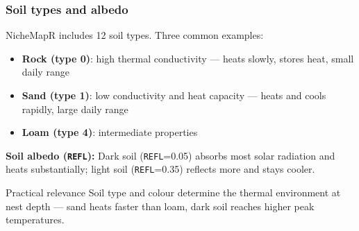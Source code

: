 \documentclass{beamer}
\begin{document}
\begin{frame}
  \frametitle{Soil types and albedo}

  NicheMapR includes 12 soil types. Three common examples:

  \vspace{0.1cm}

  \begin{itemize}
    \item \textbf{Rock (type 0)}: high thermal conductivity --- heats slowly, stores heat, small daily range
    \item \textbf{Sand (type 1)}: low conductivity and heat capacity --- heats and cools rapidly, large daily range
    \item \textbf{Loam (type 4)}: intermediate properties
  \end{itemize}

  \vspace{0.1cm}

  \textbf{Soil albedo (\texttt{REFL}):} Dark soil (\texttt{REFL}=0.05) absorbs most solar radiation and heats substantially; light soil (\texttt{REFL}=0.35) reflects more and stays cooler.

  \vspace{0.1cm}

  \begin{block}{Practical relevance}
    Soil type and colour determine the thermal environment at nest depth --- sand heats faster than loam, dark soil reaches higher peak temperatures.
  \end{block}
\end{frame}
\end{document}
